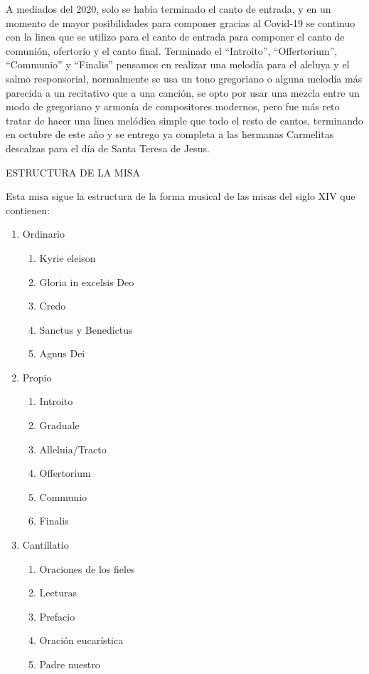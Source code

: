 \documentclass[12pt, letterpaper]{report}
\begin{document}
    A mediados del 2020, solo se hab\'ia terminado el canto de entrada, y en un momento de mayor posibilidades para
    componer gracias al Covid-19 se continuo con la linea que se utilizo para el canto de entrada para componer el
    canto de comuni\'on, ofertorio y el canto final.  Terminado el ``Introito'', ``Offertorium'', ``Communio'' y ``Finalis''
    pensamos en realizar una melod\'ia para el aleluya y el salmo responsorial, normalmente se usa un tono gregoriano
    o alguna melod\'ia m\'as parecida a un recitativo que a una canci\'on, se opto por usar una mezcla entre un modo de
    gregoriano y armon\'ia de compositores modernos, pero fue m\'as reto tratar de hacer una linea mel\'odica simple que
    todo el resto de cantos, terminando en octubre de este a\~no y se entrego ya completa a las hermanas Carmelitas
    descalzas para el d\'ia de Santa Teresa de Jesus.

    \LARGE ESTRUCTURA DE LA MISA

    \Large Esta misa sigue la estructura de la forma musical de las misas del siglo XIV que contienen:

    \renewcommand{\theenumi}{\arabic{enumi}}
    \begin{enumerate}
        \item Ordinario
        \begin{enumerate}
            \item Kyrie eleison
            \item Gloria in excelsis Deo
            \item Credo
            \item Sanctus y Benedictus
            \item Agnus Dei
        \end{enumerate}

        \item Propio
        \begin{enumerate}
            \item Introito
            \item Graduale
            \item Alleluia/Tracto
            \item Offertorium
            \item Communio
            \item Finalis
        \end{enumerate}

        \item Cantillatio
        \begin{enumerate}
            \item Oraciones de los fieles
            \item Lecturas
            \item Prefacio
            \item Oraci\'on eucar\'istica
            \item Padre nuestro
        \end{enumerate}
    \end{enumerate}
\end{document}

